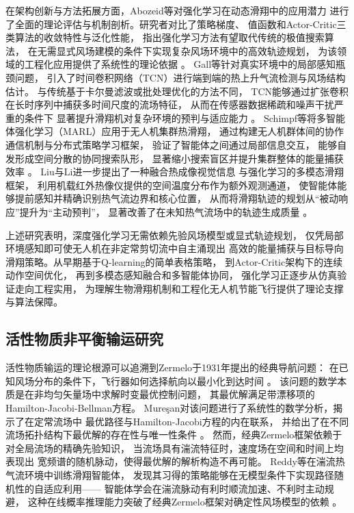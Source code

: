 在架构创新与方法拓展方面，Abozeid等对强化学习在动态滑翔中的应用潜力
进行了全面的理论评估与机制剖析。研究者对比了策略梯度、
值函数和Actor-Critic三类算法的收敛特性与泛化性能，
指出强化学习方法有望取代传统的极值搜索算法，
在无需显式风场建模的条件下实现复杂风场环境中的高效轨迹规划，
为该领域的工程化应用提供了系统性的理论依据
\cite{abozeidComprehensiveAssessmentPotential2023}。
Gall等针对真实环境中的局部感知瓶颈问题，
引入了时间卷积网络（TCN）进行端到端的热上升气流检测与风场结构估计。
与传统基于卡尔曼滤波或批处理优化的方法不同，
TCN能够通过扩张卷积在长时序列中捕获多时间尺度的流场特征，
从而在传感器数据稀疏和噪声干扰严重的条件下
显著提升滑翔机对复杂环境的预判与适应能力
\cite{gallEndtoEndThermal2024}。
Schimpf等将多智能体强化学习（MARL）应用于无人机集群热滑翔，
通过构建无人机群体间的协作通信机制与分布式策略学习框架，
验证了智能体之间通过局部信息交互，
能够自发形成空间分散的协同搜索队形，
显著缩小搜索盲区并提升集群整体的能量捕获效率
\cite{schimpfMultiAgentReinforcementLearning2021}。
Liu与Li进一步提出了一种融合热成像视觉信息
与强化学习的多模态滑翔框架，
利用机载红外热像仪提供的空间温度分布作为额外观测通道，
使智能体能够提前感知并精确识别热气流边界和核心位置，
从而将滑翔轨迹的规划从“被动响应”提升为“主动预判”，
显著改善了在未知热气流场中的轨迹生成质量
\cite{liuThermalImageGuided2026}。

上述研究表明，深度强化学习无需依赖先验风场模型或显式轨迹规划，
仅凭局部环境感知即可使无人机在非定常剪切流中自主涌现出
高效的能量捕获与目标导向滑翔策略。从早期基于Q-learning的简单表格策略，
到Actor-Critic架构下的连续动作空间优化，
再到多模态感知融合和多智能体协同，
强化学习正逐步从仿真验证走向工程实用，
为理解生物滑翔机制和工程化无人机节能飞行提供了理论支撑与算法保障。
\subsection{活性物质非平衡输运研究}

活性物质输运的理论根源可以追溯到Zermelo于1931年提出的经典导航问题：
在已知风场分布的条件下，飞行器如何选择航向以最小化到达时间
\cite{zermeloUberNavigationsproblemBei1931}。
该问题的数学本质是在非均匀矢量场中求解时变最优控制问题，
其最优解满足带漂移项的Hamilton-Jacobi-Bellman方程。
Mureşan对该问题进行了系统性的数学分析，揭示了在定常流场中
最优路径与Hamilton-Jacobi方程的内在联系，
并给出了在不同流场拓扑结构下最优解的存在性与唯一性条件
\cite{muresanZermelosNavigationProblem2014}。
然而，经典Zermelo框架依赖于对全局流场的精确先验知识，
当流场具有湍流特征时，速度场在空间和时间上均表现出
宽频谱的随机脉动，使得最优解的解析构造不再可能。
Reddy等在湍流热气流环境中训练滑翔智能体，
发现其习得的策略能够在无模型条件下实现路径随机性的自适应利用——
智能体学会在湍流脉动有利时顺流加速、不利时主动规避，
这种在线概率推理能力突破了经典Zermelo框架对确定性风场模型的依赖
\cite{reddyLearningSoarTurbulent2016}。

